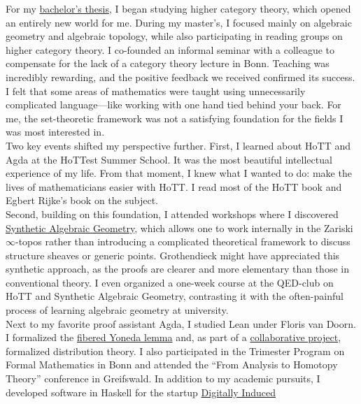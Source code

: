 \documentclass[12pt,headings=small,paper=A4,DIV=calc]{article}
\begin{document}
For my \href{https://uni-bonn.sciebo.de/s/PJUqHE52SnCKJMy}{bachelor's thesis}, I began studying higher category theory, which opened an entirely new world for me. During my master's, I focused mainly on algebraic geometry and algebraic topology, while also participating in reading groups on higher category theory. I co-founded an informal seminar with a colleague to compensate for the lack of a category theory lecture in Bonn. Teaching was incredibly rewarding, and the positive feedback we received confirmed its success. \\
I felt that some areas of mathematics were taught using unnecessarily complicated language---like working with one hand tied behind your back. For me, the set-theoretic framework was not a satisfying foundation for the fields I was most interested in. \\
Two key events shifted my perspective further. First, I learned about HoTT and Agda at the HoTTest Summer School. It was the most beautiful intellectual experience of my life. From that moment, I knew what I wanted to do: make the lives of mathematicians easier with HoTT. I read most of the HoTT book and Egbert Rijke's book on the subject. \\
Second, building on this foundation, I attended workshops where I discovered \href{https://github.com/felixwellen/synthetic-zariski}{Synthetic Algebraic Geometry}, which allows one to work internally in the Zariski $\infty$-topos rather than introducing a complicated theoretical framework to discuss structure sheaves or generic points. Grothendieck might have appreciated this synthetic approach, as the proofs are clearer and more elementary than those in conventional theory. I even organized a one-week course at the QED-club on HoTT and Synthetic Algebraic Geometry, contrasting it with the often-painful process of learning algebraic geometry at university. \\

Next to my favorite proof assistant Agda, I studied Lean under Floris van Doorn. I formalized the \href{https://github.com/timlichtnau/LeanCourse23/tree/master/LeanCourse/Project}{fibered Yoneda lemma} and, as part of a \href{https://github.com/timlichtnau/BonnAnalysis/tree/master/BonnAnalysis}{collaborative project}, formalized distribution theory. I also participated in the Trimester Program on Formal Mathematics in Bonn and attended the ``From Analysis to Homotopy Theory'' conference in Greifswald. In addition to my academic pursuits, I developed software in Haskell for the startup \href{https://www.digitallyinduced.com/}{Digitally Induced} \\
\end{document}
